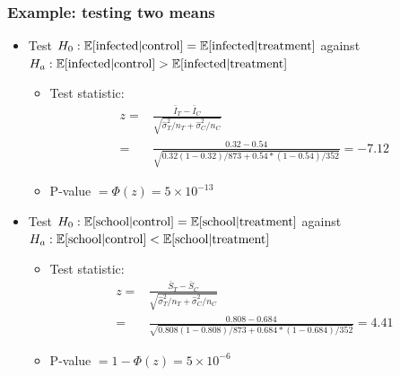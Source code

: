 \begin{frame}
  \frametitle{Example: testing two means}
  \begin{itemize}
  \item Test $H_0: \mathbb{E}[\text{infected} | \text{control} ] =
    \mathbb{E}[\text{infected} | \text{treatment}]$ against
    $H_a: \mathbb{E}[\text{infected} | \text{control} ] >
    \mathbb{E}[\text{infected} | \text{treatment}]$ 
    \begin{itemize}
    \item Test statistic:
      \begin{align*} 
        z = & \frac{\bar{I}_T - \bar{I}_C}{\sqrt{\hat{\sigma}_T^2/n_T  +
          \hat{\sigma}_C^2/n_C}} \\ = &
      \frac{0.32 - 0.54}{\sqrt{0.32(1-0.32)/873 + 0.54*(1-0.54)/352}} =
      -7.12 
    \end{align*}
  \item P-value $ = \Phi(z) =5 \times 10^{-13}$
    \end{itemize}
  \item Test $H_0: \mathbb{E}[\text{school} | \text{control} ] =
    \mathbb{E}[\text{school} | \text{treatment}]$ against
    $H_a: \mathbb{E}[\text{school} | \text{control} ] <
    \mathbb{E}[\text{school} | \text{treatment}]$ 
    \begin{itemize}
    \item Test statistic:
      \begin{align*}
        z = & \frac{\bar{S}_T - \bar{S}_C}{\sqrt{\hat{\sigma}_T^2/n_T  +
            \hat{\sigma}_C^2/n_C}} \\ = &
        \frac{0.808 - 0.684}{\sqrt{0.808(1-0.808)/873 +
            0.684*(1-0.684)/352}} = 4.41
      \end{align*}
    \item P-value $ = 1-\Phi(z) =5 \times 10^{-6}$
    \end{itemize}
  \end{itemize}  
\end{frame}

